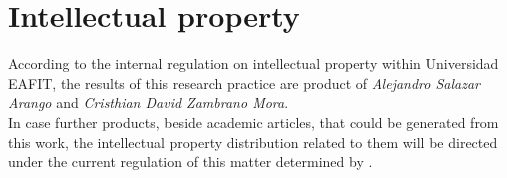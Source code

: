 \documentclass[12pt,letterpaper]{article}
\begin{document}
\begin{table}[h!]
	\begin{center}
     \caption{Schedule}
	\label{tb_sch}
       
	\end{center}
\end{table}

\section{Intellectual property}

According to the internal regulation on intellectual property within
Universidad EAFIT, the results of this research practice are product of
\emph{Alejandro Salazar Arango} and \emph{Cristhian David Zambrano Mora}.\\

In case further products, beside academic articles, that could be generated from this work, the intellectual property distribution related to them will be directed under the current regulation of this matter determined by \cite{reglamento2017}.



\end{document}
